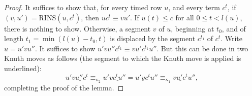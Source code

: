 \documentclass[10pt]{amsproc}
\theoremstyle{definition}
\theoremstyle{remark}
\newcommand{\rowins}{\mathrm{RINS}}
\begin{document}
\begin{proof}
  It suffices to show that, for every timed row $u$, and every term $c^t$, if $(v,u')=\rowins(u,c^t)$, then $uc^t\equiv vu'$.
  If $u(t)\leq c$ for all $0\leq t<l(u)$, there is nothing to show.
  Otherwise, a segment $v$ of $u$, beginning at $t_0$, and of length $t_1=\min(l(u)-t_0,t)$ is displaced by the segment $c^{t_1}$ of $c^t$.
  Write $u=u'vu''$.
  It suffices to show $u'vu''c^{t_1}\equiv vu'c^{t_1}u''$.
  But this can be done in two Knuth moves as follows (the segment to which the Knuth move is applied is underlined):
  \begin{displaymath}
    u'\underline{v u'' c^t} \equiv_{\kappa_2} u'\underline{vc^tu''} = \underline{u'vc^t}u'' \equiv_{\kappa_1} \underline{vu'c^t}u'',
  \end{displaymath}
  completing the proof of the lemma.
\end{proof}
\end{document}
